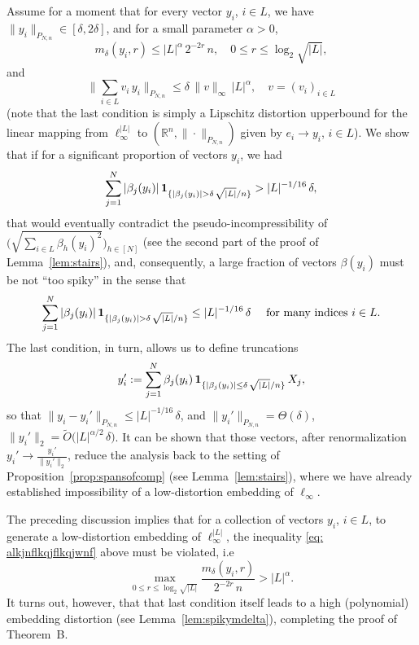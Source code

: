 \documentclass[11pt]{amsart}
\theoremstyle{definition}
\theoremstyle{plain}
\newcommand{\R}{\mathbb{R}}
\def\R{{\mathbb R}}
\begin{document}
Assume for a moment that 
for every vector $y_i$, $i\in L$, we have $\|y_i\|_{P_{N,n}}\in[\delta,2\delta]$, and
for a small parameter $\alpha>0$,
\begin{equation}\label{eq: alkjnflkqjflkqjwnf}
m_\delta(y_i,r)\leq |L|^{\alpha}\,2^{-2r}\,n,\quad 0\leq r\leq \log_2 \sqrt{|L|},
\end{equation}
and
$$
\Big\|\sum_{i\in L}v_i\,y_i\Big\|_{P_{N,n}}
\leq \delta\,\|v\|_\infty\,|L|^{\alpha},\quad  v=(v_i)_{i\in L}
$$
(note that the last condition is simply a Lipschitz distortion upperbound
for the linear mapping from $\ell_\infty^{|L|}$ to $(\R^n,\|\cdot\|_{P_{N,n}})$
given by $e_i\to y_i$, $i\in L$).
We show that if for a significant proportion of vectors $y_i$, we had
$$
\sum_{j=1}^N |\beta_j(y_i)|\,
{\bf 1}_{\{|\beta_j(y_i)|>\delta\,\sqrt{|L|}/n\}}
> |L|^{-1/16}\,\delta,
$$
that would eventually contradict the pseudo-incompressibility of $\big(\sqrt{\sum_{i\in L}\beta_h(y_i)^2}\big)_{h\in[N]}$ (see the second part of the proof of Lemma~\ref{lem:stairs}),
and, consequently, a large fraction of vectors $\beta(y_i)$
must be not ``too spiky'' in the sense that
$$
\sum_{j=1}^N |\beta_j(y_i)|\,
{\bf 1}_{\{|\beta_j(y_i)|>\delta\,\sqrt{|L|}/n\}}
\leq |L|^{-1/16}\,\delta\quad\mbox{ for many indices $i\in L$}.
$$
The last condition, in turn, allows us to define truncations
$$
y_i':=\sum\limits_{j=1}^N \beta_j(y_i)\,
{\bf 1}_{\{|\beta_j(y_i)|\leq \delta\,\sqrt{|L|}/n\}}\,X_j,
$$
so that
$\|y_i-y_i'\|_{P_{N,n}}\leq |L|^{-1/16}\,\delta$,
and $\|y_i'\|_{P_{N,n}}=\Theta(\delta)$, $\|y_i'\|_2=\tilde O\big(|L|^{\alpha/2}\,\delta\big)$.
It can be shown that those vectors, after renormalization $y_i'\longrightarrow\frac{y_i'}{\|y_i'\|_2}$, reduce
the analysis back to the setting of Proposition~\ref{prop:spansofcomp}
(see Lemma~\ref{lem:stairs}),
where we have already established impossibility of a low-distortion embedding
of $\ell_\infty$.

The preceding discussion implies that for a collection of vectors $y_i$, $i\in L$,
to generate a low-distortion embedding of $\ell_\infty^{|L|}$,
the inequality \eqref{eq: alkjnflkqjflkqjwnf} above must be violated, i.e
$$
\max\limits_{0\leq r\leq \log_2 \sqrt{|L|}}
\frac{m_\delta(y_i,r)}{2^{-2r}\,n}
>
|L|^{\alpha}.
$$
It turns out, however, that that last condition itself leads
to a high (polynomial) embedding distortion (see Lemma~\ref{lem:spikymdelta}),
completing the proof of Theorem~B.
\end{document}
